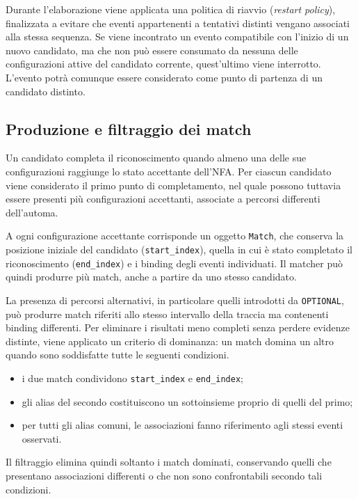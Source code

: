 Durante l'elaborazione viene applicata una politica di riavvio (\emph{restart policy}), finalizzata a evitare che eventi appartenenti a tentativi distinti vengano associati alla stessa sequenza. Se viene incontrato un evento compatibile con l'inizio di un nuovo candidato, ma che non può essere consumato da nessuna delle configurazioni attive del candidato corrente, quest'ultimo viene interrotto. L'evento potrà comunque essere considerato come punto di partenza di un candidato distinto.

\subsection{Produzione e filtraggio dei match}\label{produzione-e-filtraggio-dei-match}

Un candidato completa il riconoscimento quando almeno una delle sue configurazioni raggiunge lo stato accettante dell'NFA. Per ciascun candidato viene considerato il primo punto di completamento, nel quale possono tuttavia essere presenti più configurazioni accettanti, associate a percorsi differenti dell'automa.

A ogni configurazione accettante corrisponde un oggetto \texttt{Match}, che conserva la posizione iniziale del candidato (\texttt{start\_index}), quella in cui è stato completato il riconoscimento (\texttt{end\_index}) e i binding degli eventi individuati. Il matcher può quindi produrre più match, anche a partire da uno stesso candidato.

La presenza di percorsi alternativi, in particolare quelli introdotti da \texttt{OPTIONAL}, può produrre match riferiti allo stesso intervallo della traccia ma contenenti binding differenti. Per eliminare i risultati meno completi senza perdere evidenze distinte, viene applicato un criterio di dominanza: un match domina un altro quando sono soddisfatte tutte le seguenti condizioni.

\begin{itemize}
\tightlist
\item
  i due match condividono \texttt{start\_index} e \texttt{end\_index};
\item
  gli alias del secondo costituiscono un sottoinsieme proprio di quelli del primo;
\item
  per tutti gli alias comuni, le associazioni fanno riferimento agli stessi eventi osservati.
\end{itemize}

Il filtraggio elimina quindi soltanto i match dominati, conservando quelli che presentano associazioni differenti o che non sono confrontabili secondo tali condizioni.

